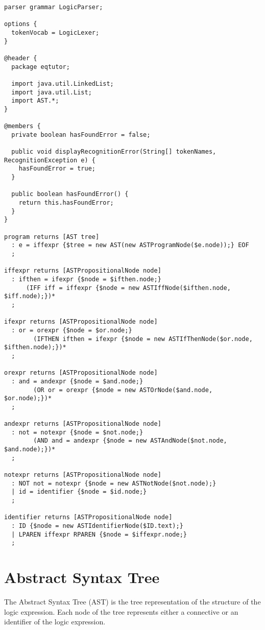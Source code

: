 \documentclass{report}
\begin{document}
\begin{verbatim}
parser grammar LogicParser;

options {
  tokenVocab = LogicLexer;
}

@header {
  package eqtutor;

  import java.util.LinkedList;
  import java.util.List;
  import AST.*;
}

@members {
  private boolean hasFoundError = false;

  public void displayRecognitionError(String[] tokenNames, RecognitionException e) {
    hasFoundError = true;
  }

  public boolean hasFoundError() {
    return this.hasFoundError;
  }
}

program returns [AST tree]
  : e = iffexpr {$tree = new AST(new ASTProgramNode($e.node));} EOF
  ;

iffexpr returns [ASTPropositionalNode node]
  : ifthen = ifexpr {$node = $ifthen.node;} 
	  (IFF iff = iffexpr {$node = new ASTIffNode($ifthen.node, $iff.node);})*
  ;
  	
ifexpr returns [ASTPropositionalNode node]
  : or = orexpr {$node = $or.node;} 
		(IFTHEN ifthen = ifexpr {$node = new ASTIfThenNode($or.node, $ifthen.node);})*
  ;

orexpr returns [ASTPropositionalNode node]
  : and = andexpr {$node = $and.node;} 
		(OR or = orexpr {$node = new ASTOrNode($and.node, $or.node);})*
  ;

andexpr returns [ASTPropositionalNode node]
  : not = notexpr {$node = $not.node;} 
		(AND and = andexpr {$node = new ASTAndNode($not.node, $and.node);})*
  ;

notexpr returns [ASTPropositionalNode node]
  : NOT not = notexpr {$node = new ASTNotNode($not.node);}
  | id = identifier {$node = $id.node;}
  ;

identifier returns [ASTPropositionalNode node]
  : ID {$node = new ASTIdentifierNode($ID.text);}
  | LPAREN iffexpr RPAREN {$node = $iffexpr.node;}
  ;
\end{verbatim}

\section{Abstract Syntax Tree}

The Abstract Syntax Tree (AST) is the tree representation of the structure
of the logic expression. Each node of the tree represents either a connective
or an identifier of the logic expression.
\end{document}
